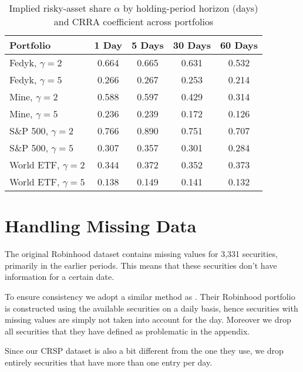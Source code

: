 \begin{appendices}
\begin{table}[ht]
\centering
\caption{Implied risky-asset share $\alpha$ by holding-period horizon (days) and CRRA coefficient across portfolios}
\label{tab:gamma_implied}
\begin{tabular}{l|c c c c}
    \toprule
    Portfolio & 1 Day & 5 Days & 30 Days & 60 Days \\
    \midrule
    Fedyk, $\gamma=2$   & 0.664 & 0.665 & 0.631 & 0.532 \\
    Fedyk, $\gamma=5$   & 0.266 & 0.267 & 0.253 & 0.214 \\
    Mine,  $\gamma=2$   & 0.588 & 0.597 & 0.429 & 0.314 \\
    Mine,  $\gamma=5$   & 0.236 & 0.239 & 0.172 & 0.126 \\
    S\&P 500, $\gamma=2$ & 0.766 & 0.890 & 0.751 & 0.707 \\
    S\&P 500, $\gamma=5$ & 0.307 & 0.357 & 0.301 & 0.284 \\
    World ETF, $\gamma=2$& 0.344 & 0.372 & 0.352 & 0.373 \\
    World ETF, $\gamma=5$& 0.138 & 0.149 & 0.141 & 0.132 \\
    \end{tabular}
\end{table}
    




\clearpage
\section{Handling Missing Data}
\label{sec:data}
The original Robinhood dataset contains missing values for 3,331 securities, primarily in the earlier periods. 
This means that these securities don't have information for a certain date.
   
To ensure consistency we adopt a similar method as \cite{Fedyk2024}. Their Robinhood portfolio is constructed using the available securities on a daily basis, 
hence securities with missing values are simply not taken into account for the day. Moreover we drop all securities that they have defined as problematic in the appendix.

Since our CRSP dataset is also a bit different from the one they use, we drop entirely securities that have more than one entry per day.


\end{appendices}